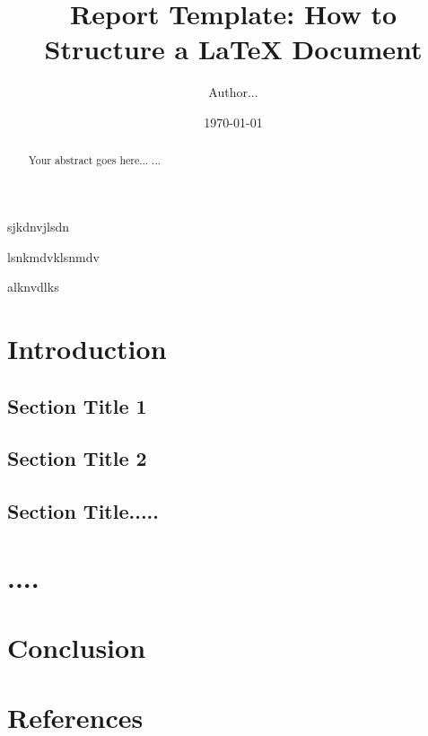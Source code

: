 \documentclass[11pt,a4paper]{report}
\begin{document}
\title{Report Template: How to Structure a LaTeX Document}
\author{Author...}
\date{\today}
\maketitle

\begin{abstract}
Your abstract goes here...
...
\end{abstract}
sjkdnvjlsdn


lsnkmdvklsnmdv

alknvdlks
\chapter{Introduction}
\section{Section Title 1}
\section{Section Title 2}
\section{Section Title.....}

\chapter{....}

\chapter{Conclusion}


\chapter*{References}
\end{document}

